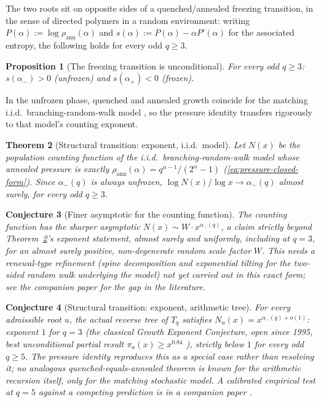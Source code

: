 \documentclass[11pt]{article}
\newtheorem{theorem}{Theorem}[section]
\newtheorem{proposition}[theorem]{Proposition}
\newtheorem{conjecture}[theorem]{Conjecture}
\theoremstyle{definition}
\theoremstyle{remark}
\begin{document}
The two roots sit on opposite sides of a quenched/annealed freezing
transition, in the sense of directed polymers in a random environment:
writing $P(\alpha):=\log\rho_{\mathrm{ann}}(\alpha)$ and
$s(\alpha):=P(\alpha)-\alpha P'(\alpha)$ for the associated entropy,
the following holds for every odd $q\ge3$.

\begin{proposition}[The freezing transition is unconditional]\label{prop:always-frozen}
For every odd $q\ge3$: $s(\alpha_-)>0$ (\emph{unfrozen}) and
$s(\alpha_+)<0$ (\emph{frozen}).
\end{proposition}

In the unfrozen phase, quenched and annealed growth coincide for the
matching i.i.d.\ branching-random-walk model \cite{Biggins1992}, so the
pressure identity transfers rigorously to that model's counting
exponent.

\begin{theorem}[Structural transition: exponent, i.i.d.\ model]\label{thm:transition-model}
Let $N(x)$ be the population counting function of the i.i.d.\
branching-random-walk model whose annealed pressure is exactly
$\rho_{\mathrm{ann}}(\alpha)=q^{\alpha-1}/(2^\alpha-1)$
(\eqref{eq:pressure-closed-form}). Since
$\alpha_-(q)$ is always unfrozen, $\log N(x)/\log x\to\alpha_-(q)$
almost surely, for every odd $q\ge3$.
\end{theorem}

\begin{conjecture}[Finer asymptotic for the counting function]\label{prop:transition-fine}
The counting function has the sharper asymptotic $N(x)\sim
W\cdot x^{\alpha_-(q)}$, a claim strictly beyond
Theorem~\ref{thm:transition-model}'s exponent statement, almost surely
and uniformly, including at $q=3$, for an almost surely positive,
non-degenerate random scale factor $W$. This needs a renewal-type
refinement (spine decomposition and exponential tilting for the
two-sided random walk underlying the model) not yet carried out in
this exact form; see the companion paper for the gap in the
literature.
\end{conjecture}

\begin{conjecture}[Structural transition: exponent, arithmetic tree]\label{conj:transition-arithmetic}
For every admissible root $u$, the actual reverse tree of $T_q$
satisfies $N_u(x)=x^{\alpha_-(q)+o(1)}$: exponent $1$ for $q=3$ (the
classical Growth Exponent Conjecture, open since 1995, best
unconditional partial result $\pi_a(x)\ge x^{0.84}$
\cite{KrasikovLagarias2003}), strictly below $1$ for every odd
$q\ge5$. The pressure identity reproduces this as a special case rather
than resolving it; no analogous quenched-equals-annealed theorem is
known for the arithmetic recursion itself, only for the matching
stochastic model. A calibrated empirical test at $q=5$ against a
competing prediction is in a companion paper \cite{KLVolkovCompanion}.
\end{conjecture}
\end{document}
